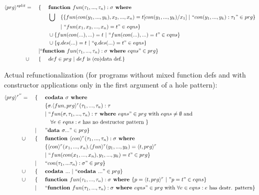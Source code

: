 \documentclass[11pt]{article} %
\begin{document}
\begin{alignat*}{4}
\langle prg \rangle^{split} & = ~&& \{ ~&& \textrm{\textbf{function }} fun(\tau_1, ..., \tau_n): \sigma \textrm{\textbf{ where }} \span\span \\
& && && \bigcup && \{ \{ fun(con(y_1, ..., y_k), x_2, ..., x_n) = t[con(y_1, ..., y_k)/x_1] ~ | ~ `` con(y_1, ..., y_k): \tau_1 " \in prg \} \\
& && && && | ~ `` fun(x_1, x_2, ..., x_n) = t " \in eqns \} \\
& && && \cup \{ fun(con(...), ...) = t ~ | ~ `` fun(con(...), ...) = t " \in eqns \} \span\span \\
& && && \cup \{ q.des(...) = t ~ | ~ `` q.des(...) = t " \in eqns \} \span\span \\
& && | `` \textrm{\textbf{function }} fun(\tau_1, ..., \tau_n): \sigma \textrm{\textbf{ where }} eqns " \in prg \} \span\span\span\span \\
& \cup && \{ && def \in prg ~ | ~ def \textrm{ is (co)data def.} \} \span\span
\end{alignat*}

Actual refunctionalization (for programs without mixed function defs and with constructor applications only in the first argument of a hole pattern):
\begin{alignat*}{3}
\langle prg \rangle^{r''} & = ~&& \{ ~&& \textrm{\textbf{codata }} \sigma \textrm{\textbf{ where }} \\
& && && \{ \sigma .\langle fun, prg \rangle^r (\tau_1, ..., \tau_n): \tau \\
& && && | ~ `` fun (\sigma, \tau_1, ..., \tau_n): \tau \textrm{\textbf{ where }} eqns " \in prg \textrm{ with } eqns \neq \emptyset \textrm{ and } \\
& && &&\quad \forall e \in eqns: e \textrm{ has no destructor pattern }  \} \\
& && | && "\textrm{\textbf{data }} \sigma ..." \in prg \} \\
& \cup && \{ && \textrm{\textbf{function }} \langle con \rangle^r (\tau_1, ..., \tau_n): \sigma \textrm{\textbf{ where }} \\
& && && \{ \langle con \rangle^r (x_1, ..., x_n) .\langle fun \rangle^r (y_1, ..., y_k) = \langle t, prg \rangle^r \\
& && && | ~ `` fun(con(x_1, ..., x_n), y_1, ..., y_k) = t " \in prg \} \\
& && | && `` con(\tau_1, ... \tau_n): \sigma " \in prg \} \\
& \cup && \{ && \textrm{\textbf{codata }} ... ~ | ~ `` \textrm{\textbf{codata }} ... " \in prg \} \\
& \cup && \{ && \textrm{\textbf{function }} fun(\tau_1, ..., \tau_n): \sigma \textrm{\textbf{ where }} \{ p = \langle t, prg \rangle^r ~ | ~ "p = t" \in eqns \} \\
& && | && `` \textrm{\textbf{function }} fun(\tau_1, ..., \tau_n): \sigma \textrm{\textbf{ where }} eqns " \in prg \textrm{ with } \forall e \in eqns: e \textrm{ has destr. pattern}\} 
\end{alignat*}
\end{document}
